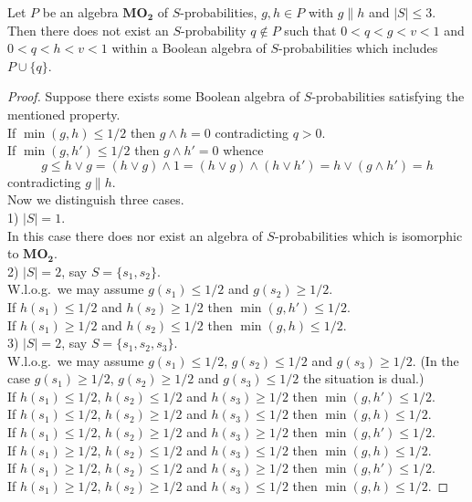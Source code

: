 \documentclass[10pt,a4paper]{amsart}
\begin{document}
\begin{lemma}\label{lm2}
Let $P$ be an algebra $\mathbf{MO_2}$ of $S$-probabilities, $g,h\in P$ with $g\parallel h$ and $|S|\le3$. Then there does not exist an $S$-probability $q\notin P$ such that $0<q<g<v<1$ and $0<q<h<v<1$ within a Boolean algebra of $S$-probabilities which includes $P\cup\{q\}$.
\end{lemma}

\begin{proof}
Suppose there exists some Boolean algebra of $S$-probabilities satisfying the mentioned property. \\
If $\min(g,h)\le1/2$ then $g\wedge h=0$ contradicting $q>0$. \\
If $\min(g,h')\le1/2$ then $g\wedge h'=0$ whence
\[
g\le h\vee g=(h\vee g)\wedge1=(h\vee g)\wedge(h\vee h')=h\vee(g\wedge h')=h
\]
contradicting $g\parallel h$. \\
Now we distinguish three cases. \\
1) $|S|=1$. \\
In this case there does nor exist an algebra of $S$-probabilities which is isomorphic to $\mathbf{MO_2}$. \\
2) $|S|=2$, say $S=\{s_1,s_2\}$. \\
W.l.o.g.\ we may assume $g(s_1)\le1/2$ and $g(s_2)\ge1/2$. \\
If $h(s_1)\le1/2$ and $h(s_2)\ge1/2$ then $\min(g,h')\le1/2$. \\
If $h(s_1)\ge1/2$ and $h(s_2)\le1/2$ then $\min(g,h)\le1/2$. \\
3) $|S|=2$, say $S=\{s_1,s_2,s_3\}$. \\
W.l.o.g.\ we may assume $g(s_1)\le1/2$, $g(s_2)\le1/2$ and $g(s_3)\ge1/2$. (In the case $g(s_1)\ge1/2$, $g(s_2)\ge1/2$ and $g(s_3)\le1/2$ the situation is dual.) \\
If $h(s_1)\le1/2$, $h(s_2)\le1/2$ and $h(s_3)\ge1/2$ then $\min(g,h')\le1/2$. \\
If $h(s_1)\le1/2$, $h(s_2)\ge1/2$ and $h(s_3)\le1/2$ then $\min(g,h)\le1/2$. \\
If $h(s_1)\le1/2$, $h(s_2)\ge1/2$ and $h(s_3)\ge1/2$ then $\min(g,h')\le1/2$. \\
If $h(s_1)\ge1/2$, $h(s_2)\le1/2$ and $h(s_3)\le1/2$ then $\min(g,h)\le1/2$. \\
If $h(s_1)\ge1/2$, $h(s_2)\le1/2$ and $h(s_3)\ge1/2$ then $\min(g,h')\le1/2$. \\
If $h(s_1)\ge1/2$, $h(s_2)\ge1/2$ and $h(s_3)\le1/2$ then $\min(g,h)\le1/2$.
\end{proof}
\end{document}
